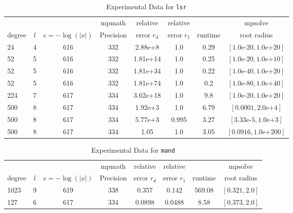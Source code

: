 \documentclass[sigconf]{acmart}
\begin{document}
\begin{table}[t]
\caption{Experimental Data for \texttt{lsr}} %
\label{tab:lsr}
\vskip -0.15in
\begin{center}
\begin{small}
\begin{sc}
\begin{tabular}{lccccccc}
\toprule
&  &  & mpmath & relative  & relative &  & mpsolve \\
degree  & $l$& $e=-\log(|x|)$& Precision &error $r_d$       & error $r_1$ &runtime& root radius\\
\midrule
 24 & 4 & 616 & 332 & 2.88e+8 & 1.0 & 0.29 & $[1.0\text{e-}20, 1.0\text{e+}20]$\\
 52 & 5 & 616 & 332 & 1.81e+14 & 1.0 & 0.25 & $[1.0\text{e-}20, 1.0\text{e+}10]$\\ %
 52 & 5 & 616 & 332 & 1.81e+34 & 1.0 & 0.22 & $[1.0\text{e-}40, 1.0\text{e+}20]$\\ %
 52 & 5 & 616 & 332 & 1.81e+74 & 1.0 & 0.2 & $[1.0\text{e-}80, 1.0\text{e+}40]$\\ %
 224 & 7 & 617 & 334 & 3.62e+18 & 1.0 & 9.8 & $[1.0\text{e-}20, 1.0\text{e+}20]$\\
 500 & 8 & 617 & 334 & 1.92e+3 & 1.0 & 6.79 & $[0.0001, 2.0\text{e+}4]$\\
 500 & 8 & 617 & 334 & 5.77e+3 & 0.995 & 3.27 & $[3.33\text{e-}5, 1.0\text{e+}3]$\\
 500 & 8 & 617 & 334 & 1.05 & 1.0 & 3.05 & $[0.0916, 1.0\text{e+}200]$\\
\bottomrule
\end{tabular}
\end{sc}
\end{small}
\end{center}
\vskip 0.05in
\end{table}


\begin{table}[t]
\caption{Experimental Data for \texttt{mand}} %
\label{tab:mand}
\vskip -0.15in
\begin{center}
\begin{small}
\begin{sc}
\begin{tabular}{lccccccc}
\toprule
&  &  & mpmath & relative  & relative &  & mpsolve \\
degree  & $l$& $e=-\log(|x|)$& Precision &error $r_d$       & error $r_1$ &runtime& root radius\\
 1023 & 9 & 619 & 338 & 0.357 & 0.142 & 569.08 & $[0.321, 2.0]$\\
 127 & 6 & 617 & 334 & 0.0898 & 0.0488 & 8.58 & $[0.373, 2.0]$\\
\midrule

\bottomrule
\end{tabular}
\end{sc}
\end{small}
\end{center}
\vskip 0.05in
\end{table}
\end{document}
